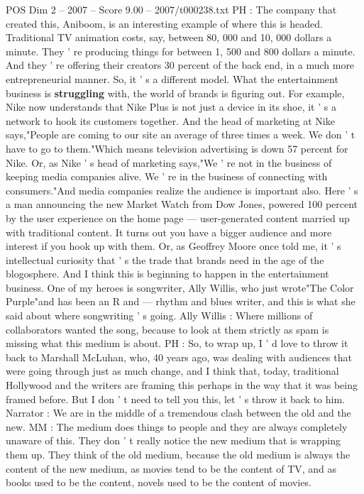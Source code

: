 \begin{textsample}{POS Dim 2 – 2007 – Score 9.00 – 2007/t000238.txt}
PH : The company that created this, Aniboom, is an interesting example of where this is headed.
Traditional TV animation costs, say, between 80, 000 and 10, 000 dollars a minute.
They ' re producing things for between 1, 500 and 800 dollars a minute.
And they ' re offering their creators 30 percent of the back end, in a much more entrepreneurial manner.
So, it ' s a different model.
What the entertainment business is \textbf{struggling} with, the world of brands is figuring out.
For example, Nike now understands that Nike Plus is not just a device in its shoe, it ' s a network to hook its customers together.
And the head of marketing at Nike says,"People are coming to our site an average of three times a week.
We don ' t have to go to them."Which means television advertising is down 57 percent for Nike.
Or, as Nike ' s head of marketing says,"We ' re not in the business of keeping media companies alive.
We ' re in the business of connecting with consumers."And media companies realize the audience is important also.
Here ' s a man announcing the new Market Watch from Dow Jones, powered 100 percent by the user experience on the home page — user-generated content married up with traditional content.
It turns out you have a bigger audience and more interest if you hook up with them.
Or, as Geoffrey Moore once told me, it ' s intellectual curiosity that ' s the trade that brands need in the age of the blogosphere.
And I think this is beginning to happen in the entertainment business.
One of my heroes is songwriter, Ally Willis, who just wrote"The Color Purple"and has been an R and — rhythm and blues writer, and this is what she said about where songwriting ' s going.
Ally Willis : Where millions of collaborators wanted the song, because to look at them strictly as spam is missing what this medium is about.
PH : So, to wrap up, I ' d love to throw it back to Marshall McLuhan, who, 40 years ago, was dealing with audiences that were going through just as much change, and I think that, today, traditional Hollywood and the writers are framing this perhaps in the way that it was being framed before.
But I don ' t need to tell you this, let ' s throw it back to him.
Narrator : We are in the middle of a tremendous clash between the old and the new.
MM : The medium does things to people and they are always completely unaware of this.
They don ' t really notice the new medium that is wrapping them up.
They think of the old medium, because the old medium is always the content of the new medium, as movies tend to be the content of TV, and as books used to be the content, novels used to be the content of movies.

\end{textsample}
